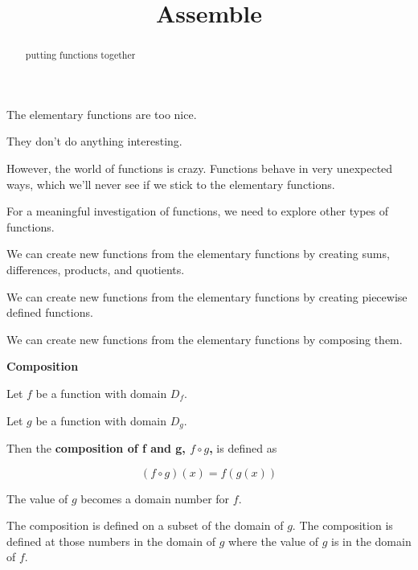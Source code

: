 \documentclass{ximera}
\title{Assemble}
\begin{document}
\begin{abstract}
putting functions together
\end{abstract}
\maketitle





The elementary functions are too nice.

They don't do anything interesting.

However, the world of functions is crazy.  Functions behave in very unexpected ways, which we'll never see if we stick to the elementary functions.

For a meaningful investigation of functions, we need to explore other types of functions.

We can create new functions from the elementary functions by creating sums, differences, products, and quotients.


We can create new functions from the elementary functions by creating piecewise defined functions.


We can create new functions from the elementary functions by composing them. 




\begin{template} \textbf{\textcolor{blue!55!black}{Composition}}  


Let $f$ be a function with domain $D_f$.


Let $g$ be a function with domain $D_g$.




Then the \textbf{\textcolor{blue!55!black}{composition of f and g, $f \circ g$,}} is defined as

\[
(f \circ g)(x) = f(g(x))
\] 


The value of $g$ becomes a domain number for $f$.


The composition is defined on a subset of the domain of $g$.  The composition is defined at those numbers in the domain of $g$ where the value of $g$ is in the domain of $f$.




\end{template}
\end{document}
